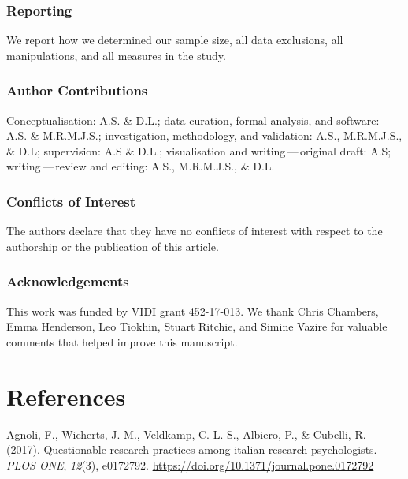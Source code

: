 \documentclass[british,,jou,floatsintext]{apa6}
\begin{document}
\hypertarget{reporting}{%
\subsubsection{Reporting}\label{reporting}}

We report how we determined our sample size, all data exclusions, all manipulations, and all measures in the study.

\hypertarget{author-contributions}{%
\subsubsection{Author Contributions}\label{author-contributions}}

Conceptualisation: A.S. \& D.L.; data curation, formal analysis, and software: A.S. \& M.R.M.J.S.; investigation, methodology, and validation: A.S., M.R.M.J.S., \& D.L; supervision: A.S \& D.L.; visualisation and writing\(\,\)---\(\,\)original draft: A.S; writing\(\,\)---\(\,\)review and editing: A.S., M.R.M.J.S., \& D.L.

\hypertarget{conflicts-of-interest}{%
\subsubsection{Conflicts of Interest}\label{conflicts-of-interest}}

The authors declare that they have no conflicts of interest with respect to the authorship or the publication of this article.

\hypertarget{acknowledgements}{%
\subsubsection{Acknowledgements}\label{acknowledgements}}

This work was funded by VIDI grant 452-17-013. We thank Chris Chambers, Emma Henderson, Leo Tiokhin, Stuart Ritchie, and Simine Vazire for valuable comments that helped improve this manuscript.

\hypertarget{references}{%
\section{References}\label{references}}

\setlength{\parindent}{-0.2in}
\setlength{\leftskip}{0.2in}

\hypertarget{refs}{}
\leavevmode\hypertarget{ref-Agnoli2017}{}%
Agnoli, F., Wicherts, J. M., Veldkamp, C. L. S., Albiero, P., \& Cubelli, R. (2017). Questionable research practices among italian research psychologists. \emph{PLOS ONE}, \emph{12}(3), e0172792. \url{https://doi.org/10.1371/journal.pone.0172792}
\end{document}
